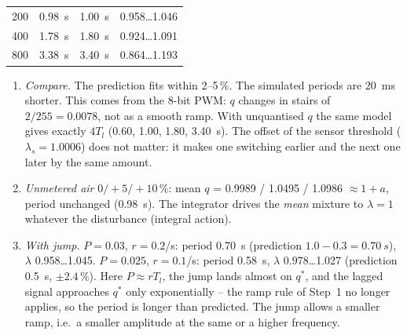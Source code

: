 \begin{solution}
\begin{center}
\begin{tabular}{@{}rccc@{}}
200 & \SI{0.98}{s} & \SI{1.00}{s} & 0.958\dots1.046 \\
400 & \SI{1.78}{s} & \SI{1.80}{s} & 0.924\dots1.091 \\
800 & \SI{3.38}{s} & \SI{3.40}{s} & 0.864\dots1.193 \\
\bottomrule
\end{tabular}
\end{center}
\begin{enumerate}[label=Step \arabic*:,leftmargin=*,itemsep=1pt,resume]
  \item \emph{Compare.} The prediction fits within 2--5\,\%. The simulated
    periods are \SI{20}{ms} shorter. This comes from the 8-bit PWM: $q$ changes
    in stairs of $2/255=0.0078$, not as a smooth ramp. With unquantised $q$ the
    same model gives exactly $4T_l$ (0.60, 1.00, 1.80, \SI{3.40}{s}). The offset
    of the sensor threshold ($\lambda_s=1.0006$) does not matter: it makes one
    switching earlier and the next one later by the same amount.
  \item \emph{Unmetered air} $0/+5/+10\,\%$: mean $q$ = 0.9989 / 1.0495 /
    1.0986 $\approx 1+a$, period unchanged (\SI{0.98}{s}). The integrator
    drives the \emph{mean} mixture to $\lambda=1$ whatever the disturbance
    (integral action).
  \item \emph{With jump.} $P=0.03$, $r=0.2$/s: period \SI{0.70}{s}
    (prediction $1.0-0.3=\SI{0.70}{s}$), $\lambda$ 0.958\dots1.045.
    $P=0.025$, $r=0.1$/s: period \SI{0.58}{s}, $\lambda$ 0.978\dots1.027
    (prediction \SI{0.5}{s}, $\pm2.4\,\%$). Here $P\approx rT_l$, the jump lands
    almost on $q^*$, and the lagged signal approaches $q^*$ only exponentially
    -- the ramp rule of Step~1 no longer applies, so the period is longer than
    predicted. The jump allows a smaller ramp, i.e.\ a smaller amplitude at the
    same or a higher frequency.
\end{enumerate}
\end{solution}

\endgroup
